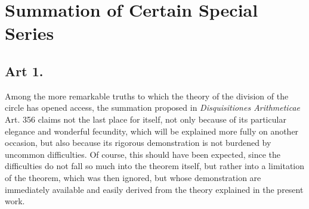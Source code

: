 \documentclass{book}
\theoremstyle{plain}
\theoremstyle{remark}
\begin{document}
\section*{Summation of Certain Special Series}

\subsection*{Art 1.}

Among the more remarkable truths to which the theory of the division of the circle has opened access, the summation proposed in \textit{Disquisitiones Arithmeticae} Art. 356 claims not the last place for itself, not only because of its particular elegance and wonderful fecundity, which will be explained more fully on another occasion, but also because its rigorous demonstration is not burdened by uncommon difficulties.  Of course, this should have been expected, since the difficulties do not fall so much into the theorem itself, but rather into a limitation of the theorem, which was then ignored, but whose demonstration are immediately available and easily derived from the theory explained in the present work. 
\end{document}
